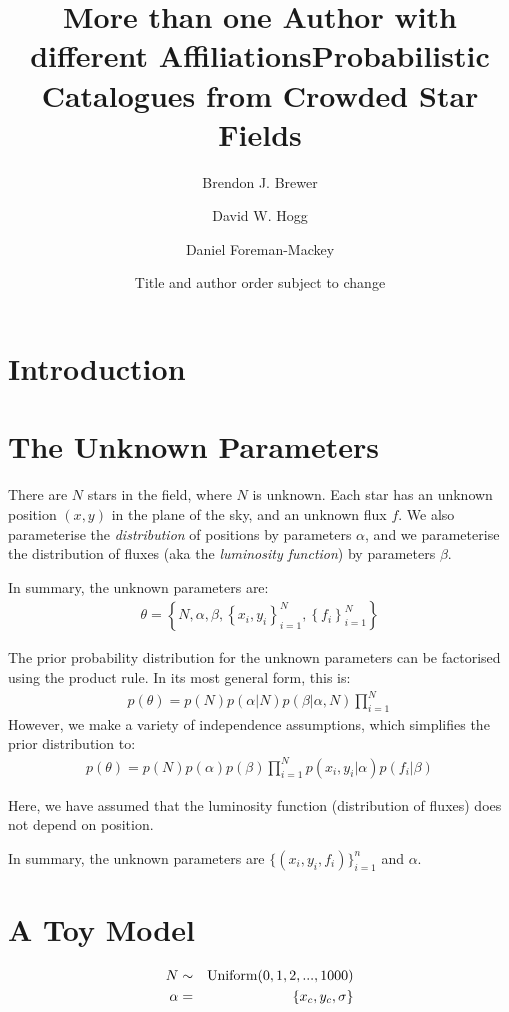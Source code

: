 \documentclass[letterpaper, 11pt]{article}
\title{More than one Author with different Affiliations}
\title{Probabilistic Catalogues from Crowded Star Fields}
\author[1,2]{Brendon J. Brewer}
\author[3]{David W. Hogg}
\author[3]{Daniel Foreman-Mackey}
\affil[1]{UCSB}
\affil[2]{Auckland}
\affil[3]{NYU}
\date{Title and author order subject to change}
\begin{document}
\maketitle

\section{Introduction}

\section{The Unknown Parameters}
There are $N$ stars in the field, where $N$ is unknown. Each star has an unknown position
$(x,y)$ in the plane of the sky, and an unknown flux $f$. We also
parameterise the {\it distribution} of positions by parameters $\alpha$,
and we parameterise the distribution of fluxes (aka the {\it luminosity function}) by parameters $\beta$.

In summary, the unknown parameters are:
\begin{eqnarray}
\theta = \left\{N, \alpha, \beta, \left\{x_i, y_i\right\}_{i=1}^N, \left\{f_i\right\}_{i=1}^N\right\}
\end{eqnarray}

The prior probability distribution for the unknown parameters can be factorised
using the product rule. In its most general form, this is:
\begin{eqnarray}
p(\theta) = p(N)p(\alpha|N)p(\beta|\alpha,N)\prod_{i=1}^N 
\end{eqnarray}
However, we make a variety of independence assumptions, which simplifies the prior
distribution to:
\begin{eqnarray}
p(\theta) = p(N)p(\alpha)p(\beta)\prod_{i=1}^N p(x_i, y_i | \alpha) p(f_i | \beta) 
\end{eqnarray}

Here, we have assumed that the luminosity function 
(distribution of fluxes) does not depend on position.

In summary, the unknown parameters are $\{(x_i, y_i, f_i)\}_{i=1}^n$
and $\alpha$.

\section{A Toy Model}

\begin{eqnarray}
N &\sim& \textnormal{Uniform}(0, 1, 2, ..., 1000) \\
\alpha &=& \left\{x_c, y_c, \sigma\right\} \\
\end{eqnarray}
\end{document}
